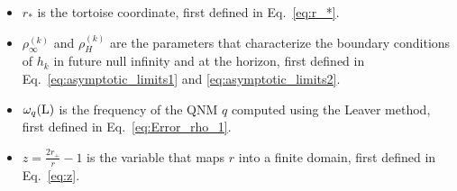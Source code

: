 \documentclass[aps,prx,amsmath,floats,floatfix,twocolumn,
  superscriptaddress,nofootinbib,showpacs]{revtex4-1}
\begin{document}
\begin{itemize}
    \item $r_*$ is the tortoise coordinate, first defined in Eq.~\eqref{eq:r_*}. 
    \item $\rho_{\infty}^{(k)}$ and $\rho_H^{(k)}$ are the parameters that characterize the boundary conditions of $h_k$ in future null infinity and at the horizon, first defined in Eq.~\eqref{eq:asymptotic_limits1} and \eqref{eq:asymptotic_limits2}. 
    \item $\omega_{q}(\rm L)$ is the frequency of the QNM $q$ computed using the Leaver method, first defined in Eq.~\eqref{eq:Error_rho_1}. 
    \item $z = \frac{2 r_+}{r} - 1$ is the variable that maps $r$ into a finite domain, first defined in Eq.~\eqref{eq:z}. 
\end{itemize}


\end{document}
